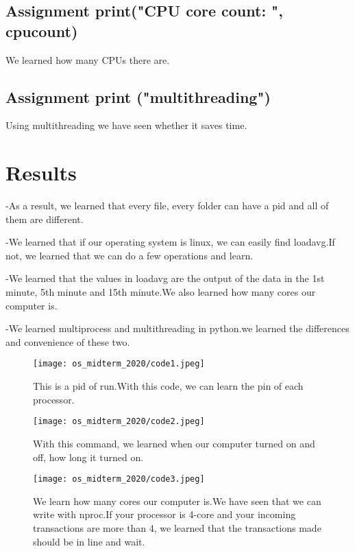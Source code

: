 \documentclass[onecolumn]{article}
\begin{document}
\subsection{Assignment print("CPU core count: ", cpucount)}
We learned how many CPUs there are.
\subsection{Assignment print ("multithreading")} 
Using multithreading we have seen whether it saves time.

\section{Results}


-As a result, we learned that every file, every folder can have a pid and all of them are different.

-We learned that if our operating system is linux, we can easily find loadavg.If not, we learned that we can do a few operations and learn.

-We learned that the values ​​in loadavg are the output of the data in the 1st minute, 5th minute and 15th minute.We also learned how many cores our computer is.

-We learned multiprocess and multithreading in python.we learned the differences and convenience of these two.


\begin{figure}[h]
\centering
   \texttt{[image: os\_midterm\_2020/code1.jpeg]} 
\caption{\label{fig:code-1}
This is a pid of run.With this code, we can learn the pin of each processor.}

\end{figure}

\begin{figure}[h]
\centering
    \texttt{[image: os\_midterm\_2020/code2.jpeg]} 
\caption{\label{fig:code-2}
With this command, we learned when our computer turned on and off, how long it turned on.}
\end{figure}


\begin{figure}[h]
\centering
	\texttt{[image: os\_midterm\_2020/code3.jpeg]} 
\caption{\label{fig:code-3}
We learn how many cores our computer is.We have seen that we can write with nproc.If your processor is 4-core and your incoming transactions are more than 4, we learned that the transactions made should be in line and wait.}
\end{figure}
\end{document}
